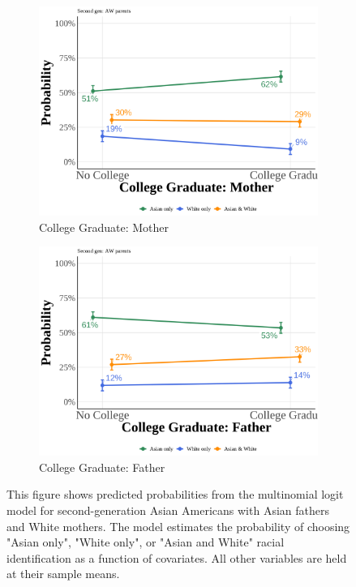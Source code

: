 \begin{center}
\begin{figure}[!htb]
\vspace{0.5cm}

\begin{subfigure}{.48\textwidth}
\caption{College Graduate: Mother}
\centering
\includegraphics[width=1\linewidth]{simple_pp_MomGradCollege_second_aw.png}
\end{subfigure}
\hfill
\begin{subfigure}{.48\textwidth}
\caption{College Graduate: Father}
\centering
\includegraphics[width=1\linewidth]{simple_pp_DadGradCollege_second_aw.png}
\end{subfigure}

\caption*{\footnotesize{This figure shows predicted probabilities from the multinomial logit model for second-generation Asian Americans with Asian fathers and White mothers. The model estimates the probability of choosing "Asian only", "White only", or "Asian and White" racial identification as a function of covariates. All other variables are held at their sample means.}}
\end{figure}
\end{center}

